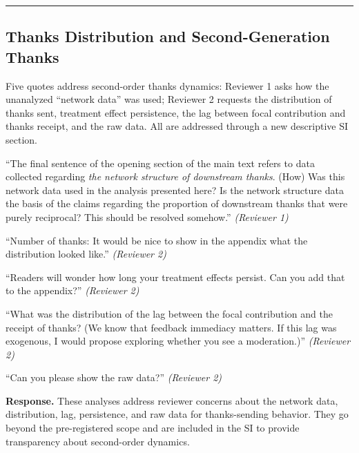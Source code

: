 \documentclass[12pt]{article}
\newenvironment{reviewquote}{%
  \def\FrameCommand{{\color{quotebarcolor}\vrule width 2pt}\colorbox{quotebg}}%
  \MakeFramed{\advance\hsize-\width \FrameRestore}%
  \small
}{%
  \endMakeFramed
}
\newcommand{\sectionnote}[1]{\par\smallskip#1\par\medskip}
\begin{document}
\bigskip\hrule\bigskip

\subsection{Thanks Distribution and Second-Generation Thanks}

\sectionnote{Five quotes address second-order thanks dynamics: Reviewer 1 asks how the unanalyzed ``network data'' was used; Reviewer 2 requests the distribution of thanks sent, treatment effect persistence, the lag between focal contribution and thanks receipt, and the raw data. All are addressed through a new descriptive SI section.}

\begin{reviewquote}
``The final sentence of the opening section of the main text refers to data collected regarding \textit{the network structure of downstream thanks}. (How) Was this network data used in the analysis presented here? Is the network structure data the basis of the claims regarding the proportion of downstream thanks that were purely reciprocal? This should be resolved somehow.'' \textit{(Reviewer 1)}
\end{reviewquote}

\begin{reviewquote}
``Number of thanks: It would be nice to show in the appendix what the distribution looked like.'' \textit{(Reviewer 2)}
\end{reviewquote}

\begin{reviewquote}
``Readers will wonder how long your treatment effects persist. Can you add that to the appendix?'' \textit{(Reviewer 2)}
\end{reviewquote}

\begin{reviewquote}
``What was the distribution of the lag between the focal contribution and the receipt of thanks? (We know that feedback immediacy matters. If this lag was exogenous, I would propose exploring whether you see a moderation.)'' \textit{(Reviewer 2)}
\end{reviewquote}

\begin{reviewquote}
``Can you please show the raw data?'' \textit{(Reviewer 2)}
\end{reviewquote}

\textbf{Response.} These analyses address reviewer concerns about the network data, distribution, lag, persistence, and raw data for thanks-sending behavior. They go beyond the pre-registered scope and are included in the SI to provide transparency about second-order dynamics.
\end{document}
